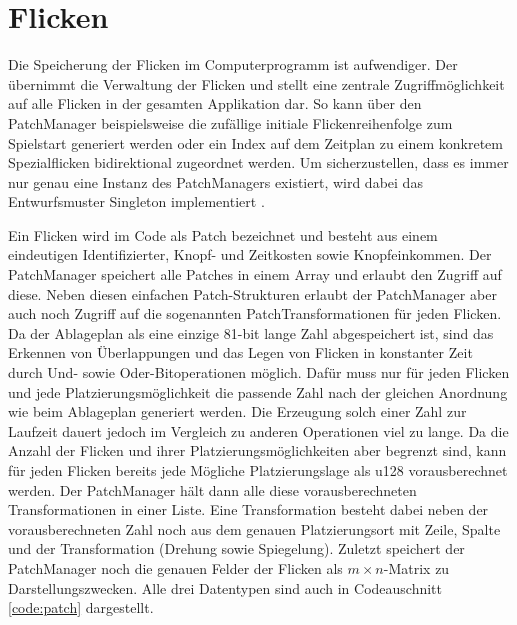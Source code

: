 \section{Flicken}

Die Speicherung der Flicken im Computerprogramm ist aufwendiger. Der  übernimmt die Verwaltung der Flicken und stellt eine zentrale Zugriffmöglichkeit auf alle Flicken in der gesamten Applikation dar. So kann über den PatchManager beispielsweise die zufällige initiale Flickenreihenfolge zum Spielstart generiert werden oder ein Index auf dem Zeitplan zu einem konkretem Spezialflicken bidirektional zugeordnet werden. Um sicherzustellen, dass es immer nur genau eine Instanz des PatchManagers existiert, wird dabei das Entwurfsmuster Singleton implementiert \cite[S. 127]{2000.Gamma}.

Ein Flicken wird im Code als Patch bezeichnet und besteht aus einem eindeutigen Identifizierter, Knopf- und Zeitkosten sowie Knopfeinkommen. Der PatchManager speichert alle Patches in einem Array und erlaubt den Zugriff auf diese. Neben diesen einfachen Patch-Strukturen erlaubt der PatchManager aber auch noch Zugriff auf die sogenannten PatchTransformationen für jeden Flicken. Da der Ablageplan als eine einzige 81-bit lange Zahl abgespeichert ist, sind das Erkennen von Überlappungen und das Legen von Flicken in konstanter Zeit durch Und- sowie Oder-Bitoperationen möglich. Dafür muss nur für jeden Flicken und jede Platzierungsmöglichkeit die passende Zahl nach der gleichen Anordnung wie beim Ablageplan generiert werden. Die Erzeugung solch einer Zahl zur Laufzeit dauert jedoch im Vergleich zu anderen Operationen viel zu lange. Da die Anzahl der Flicken und ihrer Platzierungsmöglichkeiten aber begrenzt sind, kann für jeden Flicken bereits jede Mögliche Platzierungslage als \ac{u128} vorausberechnet werden. Der PatchManager hält dann alle diese vorausberechneten Transformationen in einer Liste. Eine Transformation besteht dabei neben der vorausberechneten Zahl noch aus dem genauen Platzierungsort mit Zeile, Spalte und der Transformation (Drehung sowie Spiegelung). Zuletzt speichert der PatchManager noch die genauen Felder der Flicken als $m\times n$-Matrix zu Darstellungszwecken. Alle drei Datentypen sind auch in Codeauschnitt \ref{code:patch} dargestellt.


\vspace*{-1cm}

